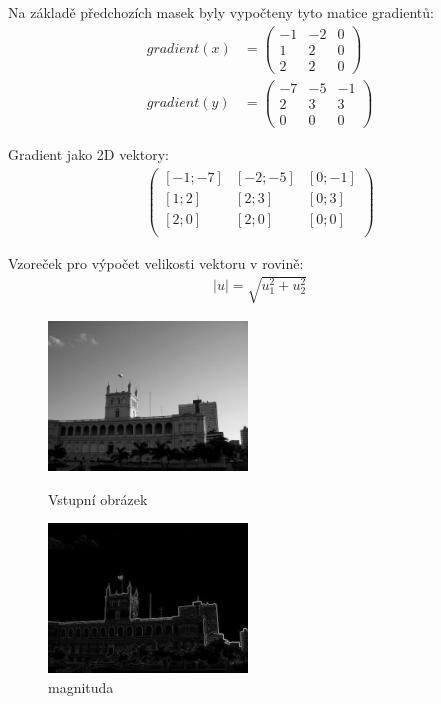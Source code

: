 \documentclass{report}
\begin{document}
Na základě předchozích masek byly vypočteny tyto matice gradientů:
\begin{align}
	\label{vystupni_gradienty}
		gradient(x) &= \begin{pmatrix}-1 & -2 & 0\\1 & 2 & 0 \\2 & 2 & 0 \end{pmatrix} \\
		gradient(y) &= \begin{pmatrix}-7 & -5 & -1 \\2 & 3 & 3 \\0 & 0 & 0 \end{pmatrix}
\end{align}

Gradient jako 2D vektory:
\begin{align}
	\label{gradient_vektory} 
		\begin{pmatrix} 
			[-1 ; -7] & [-2 ; -5] & [0 ; -1] \\
			[1 ; 2] & [2 ; 3] & [0 ; 3] \\
			[2 ; 0] & [2 ; 0] & [0 ; 0] \\
		\end{pmatrix}		   
\end{align}

Vzoreček pro výpočet velikosti vektoru v rovině:
\begin{align}
   \label{velikost_vektoru} |u| = \sqrt{u_1^2 + u_2^2}
\end{align}

\begin{figure}[H]
	\centering
	\begin{minipage}[c]{150pt}
		\centering
		\includegraphics[width=150pt]{./img/vstupni_obraz.jpg}
		\caption{Vstupní obrázek}
	\end{minipage}
	\begin{minipage}[c]{150pt}
		\includegraphics[width=150pt]{./img/magnitude.png}
		\caption{magnituda}
		\centering
	\end{minipage}
\end{figure}
\end{document}
